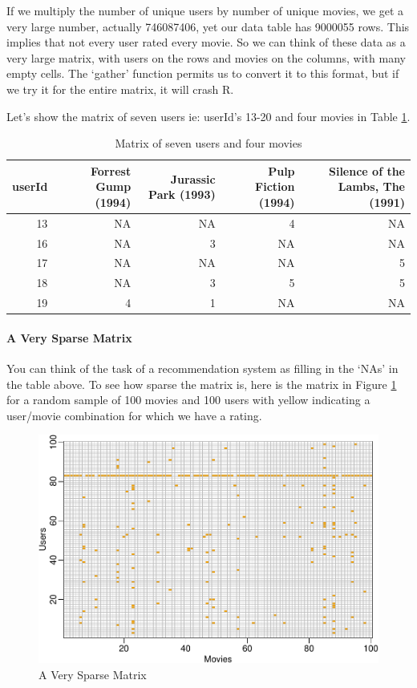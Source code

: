 \documentclass[
]{article}
\begin{document}
If we multiply the number of unique users by number of unique movies, we
get a very large number, actually 746087406, yet our data table has
9000055 rows. This implies that not every user rated every movie. So we
can think of these data as a very large matrix, with users on the rows
and movies on the columns, with many empty cells. The `gather' function
permits us to convert it to this format, but if we try it for the entire
matrix, it will crash R.

Let's show the matrix of seven users ie: userId's 13-20 and four movies
in Table \ref{tbl:matrix_seven_users_four_movies}.

\begin{table}[H]

\caption{\label{tab:eda_3}Matrix of seven users and four movies\label{tbl:matrix_seven_users_four_movies}}
\centering
\fontsize{8}{10}\selectfont
\begin{tabular}[t]{rrrrr}
\toprule
userId & Forrest Gump (1994) & Jurassic Park (1993) & Pulp Fiction (1994) & Silence of the Lambs, The (1991)\\
\midrule
13 & NA & NA & 4 & NA\\
16 & NA & 3 & NA & NA\\
17 & NA & NA & NA & 5\\
18 & NA & 3 & 5 & 5\\
19 & 4 & 1 & NA & NA\\
\bottomrule
\end{tabular}
\end{table}

\newpage

\hypertarget{a-very-sparse-matrix}{%
\paragraph{A Very Sparse Matrix}\label{a-very-sparse-matrix}}

You can think of the task of a recommendation system as filling in the
`NAs' in the table above. To see how sparse the matrix is, here is the
matrix in Figure \ref{fig:matr} for a random sample of 100 movies and
100 users with yellow indicating a user/movie combination for which we
have a rating.

\begin{figure}
\centering
\includegraphics{figures/eda_4-1.pdf}
\caption{A Very Sparse Matrix\label{fig:matr}}
\end{figure}
\end{document}
